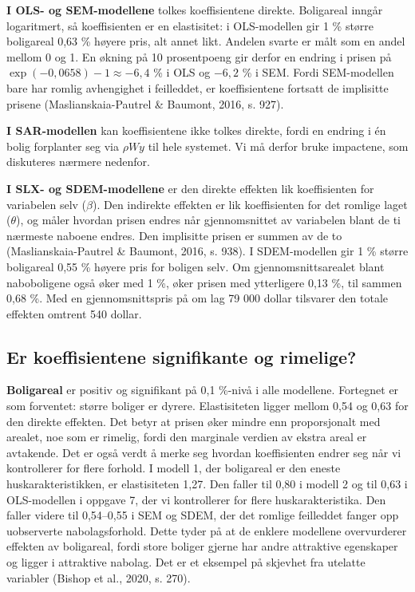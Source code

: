 \documentclass[
  norsk,
  a4paper,
]{article}
\begin{document}
\textbf{I OLS- og SEM-modellene} tolkes koeffisientene direkte.
Boligareal inngår logaritmert, så koeffisienten er en elastisitet: i
OLS-modellen gir 1 \% større boligareal 0,63 \% høyere pris, alt annet
likt. Andelen svarte er målt som en andel mellom 0 og 1. En økning på 10
prosentpoeng gir derfor en endring i prisen på
\(\exp(-0{,}0658) - 1 \approx -6{,}4\) \% i OLS og \(-6{,}2\) \% i SEM.
Fordi SEM-modellen bare har romlig avhengighet i feilleddet, er
koeffisientene fortsatt de implisitte prisene (Maslianskaia-Pautrel \&
Baumont, 2016, s. 927).

\textbf{I SAR-modellen} kan koeffisientene ikke tolkes direkte, fordi en
endring i én bolig forplanter seg via \(\rho W y\) til hele systemet. Vi
må derfor bruke impactene, som diskuteres nærmere nedenfor.

\textbf{I SLX- og SDEM-modellene} er den direkte effekten lik
koeffisienten for variabelen selv (\(\beta\)). Den indirekte effekten er
lik koeffisienten for det romlige laget (\(\theta\)), og måler hvordan
prisen endres når gjennomsnittet av variabelen blant de ti nærmeste
naboene endres. Den implisitte prisen er summen av de to
(Maslianskaia-Pautrel \& Baumont, 2016, s. 938). I SDEM-modellen gir 1
\% større boligareal 0,55 \% høyere pris for boligen selv. Om
gjennomsnittsarealet blant naboboligene også øker med 1 \%, øker prisen
med ytterligere 0,13 \%, til sammen 0,68 \%. Med en gjennomsnittspris på
om lag 79 000 dollar tilsvarer den totale effekten omtrent 540 dollar.

\subsection{Er koeffisientene signifikante og
rimelige?}\label{er-koeffisientene-signifikante-og-rimelige}

\textbf{Boligareal} er positiv og signifikant på 0,1 \%-nivå i alle
modellene. Fortegnet er som forventet: større boliger er dyrere.
Elastisiteten ligger mellom 0,54 og 0,63 for den direkte effekten. Det
betyr at prisen øker mindre enn proporsjonalt med arealet, noe som er
rimelig, fordi den marginale verdien av ekstra areal er avtakende. Det
er også verdt å merke seg hvordan koeffisienten endrer seg når vi
kontrollerer for flere forhold. I modell 1, der boligareal er den eneste
huskarakteristikken, er elastisiteten 1,27. Den faller til 0,80 i modell
2 og til 0,63 i OLS-modellen i oppgave 7, der vi kontrollerer for flere
huskarakteristika. Den faller videre til 0,54--0,55 i SEM og SDEM, der
det romlige feilleddet fanger opp uobserverte nabolagsforhold. Dette
tyder på at de enklere modellene overvurderer effekten av boligareal,
fordi store boliger gjerne har andre attraktive egenskaper og ligger i
attraktive nabolag. Det er et eksempel på skjevhet fra utelatte
variabler (Bishop et al., 2020, s. 270).
\end{document}
